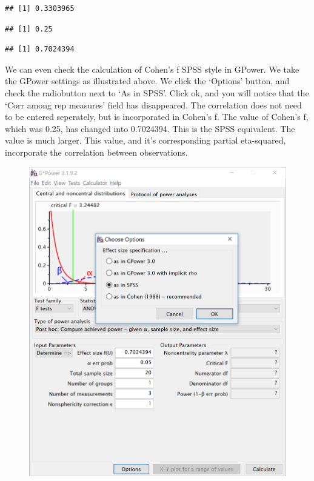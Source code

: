 \documentclass[]{article}
\newenvironment{Shaded}{\begin{snugshade}}{\end{snugshade}}
\newcommand{\KeywordTok}[1]{\textcolor[rgb]{0.13,0.29,0.53}{\textbf{#1}}}
\newcommand{\OperatorTok}[1]{\textcolor[rgb]{0.81,0.36,0.00}{\textbf{#1}}}
\newcommand{\NormalTok}[1]{#1}
\begin{document}
\begin{verbatim}
## [1] 0.3303965
\end{verbatim}

\begin{Shaded}
\end{Shaded}

\begin{verbatim}
## [1] 0.25
\end{verbatim}

\begin{Shaded}
\end{Shaded}

\begin{verbatim}
## [1] 0.7024394
\end{verbatim}

We can even check the calculation of Cohen's f SPSS style in GPower. We
take the GPower settings as illustrated above. We click the `Options'
button, and check the radiobutton next to `As in SPSS'. Click ok, and
you will notice that the `Corr among rep measures' field has
disappeared. The correlation does not need to be entered seperately, but
is incorporated in Cohen's f. The value of Cohen's f, which was 0.25,
has changed into 0.7024394. This is the SPSS equivalent. The value is
much larger. This value, and it's corresponding partial eta-squared,
incorporate the correlation between observations.

\begin{figure}
\centering
\includegraphics{screenshots/gpower_14.png}
\caption{}
\end{figure}
\end{document}
